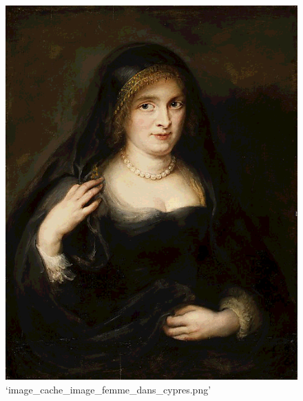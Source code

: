 \documentclass[11pt]{article}
\makeatletter
\def\maxwidth{\ifdim\Gin@nat@width>\linewidth\linewidth
    \else\Gin@nat@width\fi}
\let\Oldincludegraphics\includegraphics
\renewcommand{\includegraphics}[1]{\Oldincludegraphics[width=.8\maxwidth]{#1}}
\makeatother
\begin{document}
\begin{figure}
\centering
\includegraphics{image_cache_image_femme_dans_cypres.png}
\caption{`image\_cache\_image\_femme\_dans\_cypres.png'}
\end{figure}


    
    
    
    
\end{document}

